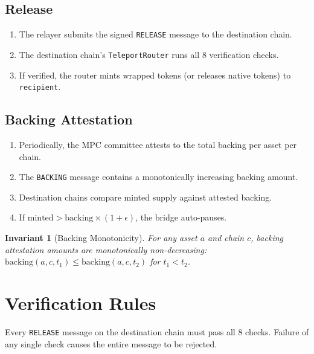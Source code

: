 \documentclass[11pt,a4paper]{article}
\newtheorem{invariant}{Invariant}[section]
\begin{document}
\subsection{Release}

\begin{enumerate}[leftmargin=2em]
\item The relayer submits the signed \texttt{RELEASE} message to the destination chain.
\item The destination chain's \texttt{TeleportRouter} runs all 8 verification checks.
\item If verified, the router mints wrapped tokens (or releases native tokens) to \texttt{recipient}.
\end{enumerate}

\subsection{Backing Attestation}

\begin{enumerate}[leftmargin=2em]
\item Periodically, the MPC committee attests to the total backing per asset per chain.
\item The \texttt{BACKING} message contains a monotonically increasing backing amount.
\item Destination chains compare minted supply against attested backing.
\item If $\text{minted} > \text{backing} \times (1 + \epsilon)$, the bridge auto-pauses.
\end{enumerate}

\begin{invariant}[Backing Monotonicity]
For any asset $a$ and chain $c$, backing attestation amounts are monotonically non-decreasing: $\text{backing}(a, c, t_1) \leq \text{backing}(a, c, t_2)$ for $t_1 < t_2$.
\end{invariant}

\section{Verification Rules}

Every \texttt{RELEASE} message on the destination chain must pass all 8 checks. Failure of any single check causes the entire message to be rejected.
\end{document}
